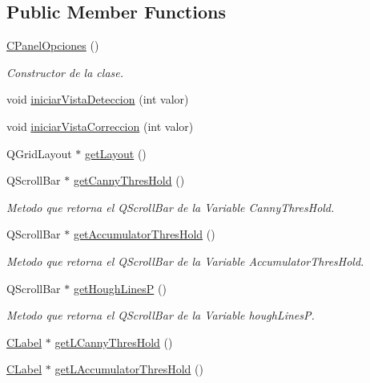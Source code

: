 \subsection*{Public Member Functions}
\begin{DoxyCompactItemize}
\item 
\hyperlink{classCPanelOpciones_ad187a964b9ac72e6571ca699035195a3}{C\+Panel\+Opciones} ()
\begin{DoxyCompactList}\small\item\em Constructor de la clase. \end{DoxyCompactList}\item 
void \hyperlink{classCPanelOpciones_a793049da71be53fa5d451b5a2681c000}{iniciar\+Vista\+Deteccion} (int valor)
\item 
void \hyperlink{classCPanelOpciones_ad3cd97a1a9fc076b9c9796a40b94f389}{iniciar\+Vista\+Correccion} (int valor)
\item 
Q\+Grid\+Layout $\ast$ \hyperlink{classCPanelOpciones_a81990572577a0fde4fa76853beb88c69}{get\+Layout} ()
\item 
Q\+Scroll\+Bar $\ast$ \hyperlink{classCPanelOpciones_a69b8584e61b0fbd7a86c9b4b1af4fd60}{get\+Canny\+Thres\+Hold} ()
\begin{DoxyCompactList}\small\item\em Metodo que retorna el Q\+Scroll\+Bar de la Variable Canny\+Thres\+Hold. \end{DoxyCompactList}\item 
Q\+Scroll\+Bar $\ast$ \hyperlink{classCPanelOpciones_adefbced180846a9e7443aa6063ea39f8}{get\+Accumulator\+Thres\+Hold} ()
\begin{DoxyCompactList}\small\item\em Metodo que retorna el Q\+Scroll\+Bar de la Variable Accumulator\+Thres\+Hold. \end{DoxyCompactList}\item 
Q\+Scroll\+Bar $\ast$ \hyperlink{classCPanelOpciones_a26734902c1b8c353c83c6b3530be3c47}{get\+Hough\+LinesP} ()
\begin{DoxyCompactList}\small\item\em Metodo que retorna el Q\+Scroll\+Bar de la Variable hough\+LinesP. \end{DoxyCompactList}\item 
\hyperlink{classCLabel}{C\+Label} $\ast$ \hyperlink{classCPanelOpciones_a1bade53fab2929a67a7323c9ecc8304f}{get\+L\+Canny\+Thres\+Hold} ()
\item 
\hyperlink{classCLabel}{C\+Label} $\ast$ \hyperlink{classCPanelOpciones_ae1541837e25eda7b7845fe78afb91acd}{get\+L\+Accumulator\+Thres\+Hold} ()

\end{DoxyCompactItemize}
